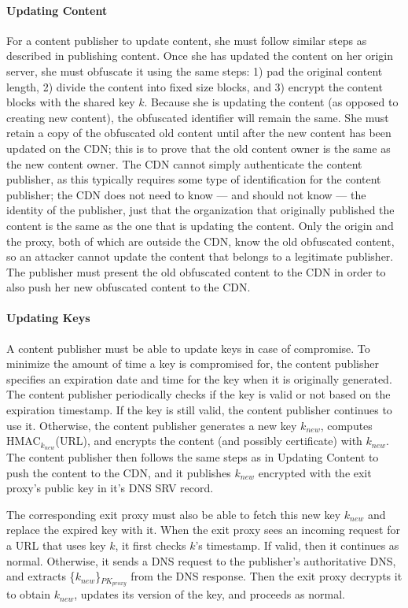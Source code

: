 \paragraph{Updating Content}
For a content publisher to update content, she must follow similar steps as described in publishing content.  
Once she has updated the content on her origin server, she must obfuscate it using the same steps: 1) pad the 
original content length, 2) divide the content into fixed size blocks, and 3) encrypt the content blocks 
with the shared key $k$.  Because she is updating the content (as opposed to creating new content), the 
obfuscated identifier will remain the same.  She must 
retain a copy of the obfuscated old content until after the new content has been updated on the CDN; this is to prove 
that the old content owner is the same as the new content owner.  The CDN cannot simply authenticate the content publisher, as this 
typically requires some type of identification for the content publisher; the CDN does not need to know --- and should not know --- 
the identity of the publisher, just that the organization that originally published the content is the same as the one that is 
updating the content.  Only the origin and the proxy, both of which are 
outside the CDN, know the old obfuscated content, so an attacker cannot update the content that belongs to 
a legitimate publisher.  The publisher must present the old obfuscated content to the CDN in order to also push 
her new obfuscated content to the CDN. 

\paragraph{Updating Keys}
A content publisher must be able to update keys in case of compromise.  To minimize the amount of time a key is compromised for, the 
content publisher specifies an expiration date and time for the key when it is originally generated.  The content publisher 
periodically checks if the key is valid or not based on the expiration timestamp.  If the key is still valid, the content publisher 
continues to use it.  Otherwise, the content publisher generates a new key $k_{new}$, computes HMAC$_{k_{new}}$(URL), and 
encrypts the content (and possibly certificate) with $k_{new}$.  The content publisher then follows the same steps as in Updating 
Content to push the content to the CDN, and it publishes $k_{new}$ encrypted with the exit proxy's public key in it's DNS SRV record.

The corresponding exit proxy must also be able to fetch this new key $k_{new}$ and replace the expired key with it.  When the exit proxy 
sees an incoming request for a URL that uses key $k$, it first checks $k$'s timestamp.  If valid, then it continues as normal.  Otherwise, 
it sends a DNS request to the publisher's authoritative DNS, and extracts \{$k_{new}$\}$_{PK_{proxy}}$ from the DNS response.  Then the exit 
proxy decrypts it to obtain $k_{new}$, updates its version of the key, and proceeds as normal.

